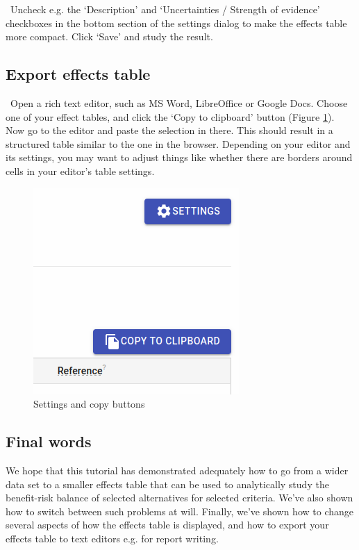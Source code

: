 \documentclass[00_mcda_tutorial.tex]{subfiles}
\begin{document}
\noindent \leftpointright \, Uncheck e.g. the ‘Description’ and ‘Uncertainties / Strength of evidence’ checkboxes in the bottom section of the settings dialog to make the effects table more compact. Click ‘Save’ and study the result.

\subsection*{Export effects table}
\noindent \leftpointright \, Open a rich text editor, such as MS Word, LibreOffice or Google Docs. Choose one of your effect tables, and click the ‘Copy to clipboard’ button (Figure \ref{fig:clipboard_button}). Now go to the editor and paste the selection in there. This should result in a structured table similar to the one in the browser. Depending on your editor and its settings, you may want to adjust things like whether there are borders around cells in your editor’s table settings.

\begin{figure}[!h]
    \centering
	\includegraphics[width=.5\textwidth]{fig/clipboardButton.png}
    \caption{Settings and copy buttons}
	\label{fig:clipboard_button}
\end{figure}

\subsection*{Final words}
We hope that this tutorial has demonstrated adequately how to go from a wider data set to a smaller effects table that can be used to analytically study the benefit-risk balance of selected alternatives for selected criteria. We’ve also shown how to switch between such problems at will. Finally, we’ve shown how to change several aspects of how the effects table is displayed, and how to export your effects table to text editors e.g. for report writing.
\end{document}
